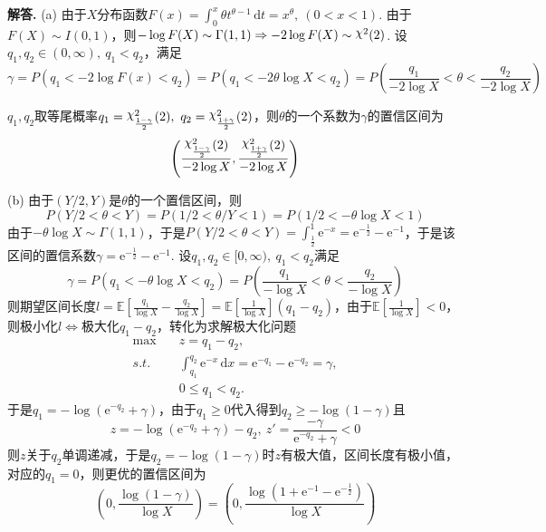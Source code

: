 \documentclass[12pt, a4paper, oneside]{ctexart}
\newenvironment{solution}[1][]{\par\noindent\textbf{#1解答. }}{\smallskip\par}  %
\let\leq=\leqslant %
\let\geq=\geqslant %
\DeclareRobustCommand{\rchi}{{\mathpalette\irchi\relax}}
\newcommand{\irchi}[2]{\raisebox{\depth}{$#1\chi$}} %
\def\E{\mathbb{E}}          %
\def\d{\mathrm{d}}          %
\def\e{\mathrm{e}}          %
\def\add{\vspace{1ex}}      %
\begin{document}
\begin{solution}
    (a) 由于$X$分布函数$F(x) = \int_0^x\theta t^{\theta-1}\,\d t=x^{\theta},\ (0<x<1)$. 由于$F(X)\sim I(0,1)$，则$-\log F(X) \sim\Gamma(1,1)\Rightarrow -2\log F(X)\sim \rchi^2(2)$. 设$q_1,q_2\in(0,\infty),\ q_1<q_2$，满足
    \begin{equation*}
        \gamma = P(q_1 < -2\log F(x) < q_2) = P(q_1 < -2\theta\log X < q_2) = P\left(\frac{q_1}{-2\log X} < \theta < \frac{q_2}{-2\log X}\right)
    \end{equation*}

    $q_1,q_2$取等尾概率$q_1 = \rchi^2_{\frac{1-\gamma}{2}}(2),\ q_2 = \rchi^2_{\frac{1+\gamma}{2}}(2)$，则$\theta$的一个系数为$\gamma$的置信区间为
    \begin{equation*}
        \left(\frac{\rchi^2_{\frac{1-\gamma}{2}}(2)}{-2\log X} ,\frac{\rchi^2_{\frac{1+\gamma}{2}}(2)}{-2\log X}\right)
    \end{equation*}

    (b) 由于$(Y/2,Y)$是$\theta$的一个置信区间，则
    \begin{equation*}
        P(Y/2<\theta<Y) = P(1/2<\theta/Y<1) = P(1/2<-\theta\log X<1)
    \end{equation*}
    由于$-\theta\log X\sim\Gamma(1,1)$，于是$P(Y/2<\theta<Y) = \int_{\frac{1}{2}}^1\e^{-x} = \e^{-\frac{1}{2}}-\e^{-1}$，于是该区间的置信系数$\gamma = \e^{-\frac{1}{2}}-\e^{-1}$. 设$q_1,q_2\in[0,\infty),\ q_1<q_2$满足
    \begin{equation*}
        \gamma = P(q_1 < -\theta\log X<q_2) = P\left(\frac{q_1}{-\log X} < \theta < \frac{q_2}{-\log X}\right)
    \end{equation*}
    则期望区间长度$l = \E\left[\frac{q_1}{\log X} - \frac{q_2}{\log X}\right] = \E\left[\frac{1}{\log X}\right](q_1-q_2)$，\add 由于$\E\left[\frac{1}{\log X}\right] < 0$，则极小化$l$$\iff$极大化$q_1-q_2$，转化为求解极大化问题
    \begin{align*}
        \max&\quad z=q_1-q_2,\\
        s.t.&\quad \int_{q_1}^{q_2}\e^{-x}\,\d x = \e^{-q_1}-\e^{-q_2} = \gamma,\\
        &\quad 0 \leq q_1 < q_2.
    \end{align*}
    于是$q_1 = -\log(\e^{-q_2}+\gamma)$，由于$q_1\geq0$代入得到$q_2 \geq -\log(1-\gamma)$且
    \begin{equation*}
        z = -\log(\e^{-q_2}+\gamma)-q_2,\ z' = \frac{-\gamma}{\e^{-q_2}+\gamma} < 0
    \end{equation*}
    则$z$关于$q_2$单调递减，于是$q_2 = -\log(1-\gamma)$时$z$有极大值，区间长度有极小值，对应的$q_1 = 0$，则更优的置信区间为
    \begin{equation*}
        \left(0,\frac{\log(1-\gamma)}{\log X}\right) = \left(0, \frac{\log(1+\e^{-1}-\e^{-\frac{1}{2}})}{\log X}\right)
    \end{equation*}
\end{solution}
\end{document}
